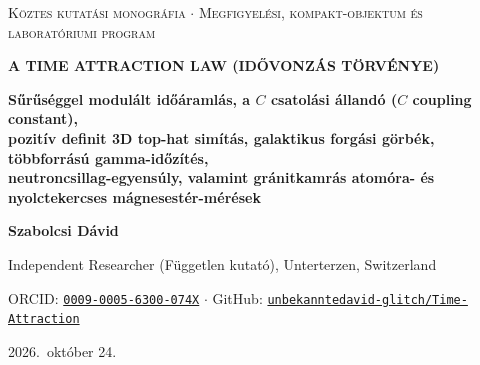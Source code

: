 \documentclass[10pt,a4paper]{article}
\begin{document}
\thispagestyle{empty}
\vspace*{1mm}
\noindent{\color{navy}\rule{\linewidth}{2pt}}\par\vspace{1.5mm}
\begin{center}
  {\footnotesize\scshape\color{slate}K\"oztes kutat\'asi monogr\'afia $\cdot$ Megfigyel\'esi, kompakt-objektum \'es laborat\'oriumi program}\par\vspace{1.5mm}
  {\LARGE\bfseries\color{navy}A TIME ATTRACTION LAW (ID\H{O}VONZ\'AS T\"ORV\'ENYE)}\par\vspace{2mm}
  {\large\bfseries\color{slate}S\H{u}r\H{u}s\'eggel modul\'alt id\H{o}\'araml\'as, a $C$ csatol\'asi \'alland\'o ($C$ coupling constant),}\\
  {\large\bfseries\color{slate}pozit\'iv definit 3D top-hat sim\'it\'as, galaktikus forg\'asi g\"orb\'ek, t\"obbforr\'as\'u gamma-id\H{o}z\'it\'es,}\\
  {\large\bfseries\color{slate}neutroncsillag-egyens\'uly, valamint gr\'anitkamr\'as atom\'ora- \'es nyolctekercses m\'agnesest\'er-m\'er\'esek}\par\vspace{2mm}
  {\normalsize\bfseries Szabolcsi D\'avid}\par\vspace{1mm}
  {\small Independent Researcher (F\"uggetlen kutat\'o), Unterterzen, Switzerland}\par
  {\small ORCID: \href{https://orcid.org/0009-0005-6300-074X}{\texttt{0009-0005-6300-074X}} $\cdot$ GitHub: \href{https://github.com/unbekanntedavid-glitch/Time-Attraction}{\texttt{unbekanntedavid-glitch/Time-Attraction}}}\par
  {\small 2026.\ okt\'ober 24.}
\end{center}
\vspace{1.5mm}
\noindent{\color{navy}\rule{\linewidth}{0.8pt}}\par\vspace{2mm}
\end{document}
